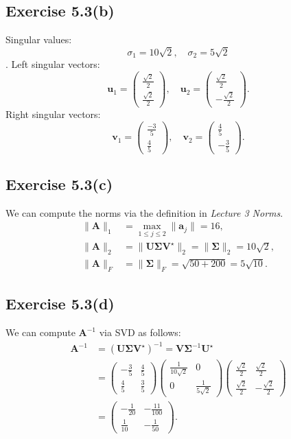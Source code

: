 \documentclass{article}
\begin{document}
\subsection{Exercise 5.3(b)}
Singular values: $$\sigma_1 = 10\sqrt{2}, \quad \sigma_2 = 5\sqrt{2}$$.
Left singular vectors:
$$
\bm{u}_1 = \begin{pmatrix}
    \frac{\sqrt{2}}{2}\\
    \frac{\sqrt{2}}{2}
\end{pmatrix},\quad \bm{u}_2 = \begin{pmatrix}
    \frac{\sqrt{2}}{2}\\
    -\frac{\sqrt{2}}{2}
\end{pmatrix}.
$$
Right singular vectors:
$$
\bm{v}_1 = \begin{pmatrix}
    \frac{-3}{5}\\
    \frac{4}{5}
\end{pmatrix},\quad \bm{v}_2 = \begin{pmatrix}
    \frac{4}{5}\\
    -\frac{3}{5}
\end{pmatrix}.
$$
\subsection{Exercise 5.3(c)}
We can compute the norms via the definition in \textit{Lecture 3 Norms}.
$$
\begin{aligned}
    \| \bm{A} \|_1 & = \max_{1 \leq j \leq 2} \| \bm{a}_j\| = 16, \\
    \| \bm{A} \|_2 & = \| \bm{U} \bm{\Sigma} \bm{V}^{\star}\|_2 = \| \bm{\Sigma} \|_2 = 10\sqrt{2},\\
    \| \bm{A} \|_F &= \| \bm{\Sigma} \|_F = \sqrt{50 + 200} = 5\sqrt{10}.
\end{aligned}
$$
\subsection{Exercise 5.3(d)}
We can compute $\bm{A}^{-1}$ via SVD as follows:
$$
\begin{aligned}
    \bm{A}^{-1} &= (\bm{U} \bm{\Sigma} \bm{V}^{\star})^{-1} = \bm{V} \bm{\Sigma}^{-1} \bm{U}^{\star} \\
    &= \begin{pmatrix}
        -\frac{3}{5} & \frac{4}{5} \\
        \frac{4}{5} & \frac{3}{5}
    \end{pmatrix} \begin{pmatrix}
        \frac{1}{10\sqrt{2}} & 0 \\
        0 & \frac{1}{5\sqrt{2}} 
    \end{pmatrix}
    \begin{pmatrix}
        \frac{\sqrt{2}}{2} & \frac{\sqrt{2}}{2} \\
        \frac{\sqrt{2}}{2} & -\frac{\sqrt{2}}{2}
    \end{pmatrix}\\
    &= \begin{pmatrix}
        -\frac{1}{20} & -\frac{11}{100} \\
        \frac{1}{10} & -\frac{1}{50}
    \end{pmatrix}.
\end{aligned}
$$
\end{document}
